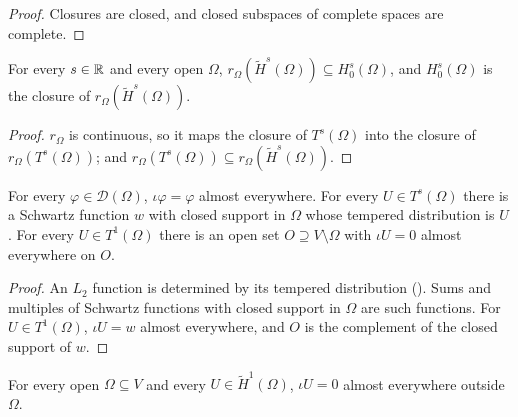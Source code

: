 \begin{proof}
\leanok
Closures are closed, and closed subspaces of complete spaces are complete.
\end{proof}

\begin{lemma}
\label{lem:sobolev-tilde-restriction-range}
\leanok
{}
For every $s \in \mathbb{R}$ and every open $\Omega$, $r_\Omega(\tilde H^s(\Omega)) \subseteq
H^s_0(\Omega)$, and $H^s_0(\Omega)$ is the closure of $r_\Omega(\tilde H^s(\Omega))$.
\end{lemma}

\begin{proof}
\leanok
$r_\Omega$ is continuous, so it maps the closure of $T^s(\Omega)$ into the closure of
$r_\Omega(T^s(\Omega))$; and $r_\Omega(T^s(\Omega)) \subseteq r_\Omega(\tilde H^s(\Omega))$.
\end{proof}

\begin{lemma}
\label{lem:sobolev-test-span-schwartz}
\leanok
{}
For every $\varphi \in \mathcal D(\Omega)$, $\iota \varphi = \varphi$ almost everywhere. For
every $U \in T^s(\Omega)$ there is a Schwartz function $w$ with closed support in $\Omega$ whose
tempered distribution is $U$. For every $U \in T^1(\Omega)$ there is an open set $O \supseteq
V \setminus \Omega$ with $\iota U = 0$ almost everywhere on $O$.
\end{lemma}

\begin{proof}
\leanok
An $L_2$ function is determined by its tempered distribution ().
Sums and multiples of Schwartz functions with closed support in $\Omega$ are such functions. For
$U \in T^1(\Omega)$, $\iota U = w$ almost everywhere, and $O$ is the complement of the closed
support of $w$.
\end{proof}

\begin{lemma}
\label{lem:tilde-space-vanishes-outside}
\leanok
{}
For every open $\Omega \subseteq V$ and every $U \in \tilde H^1(\Omega)$, $\iota U = 0$ almost
everywhere outside $\Omega$.
\end{lemma}

